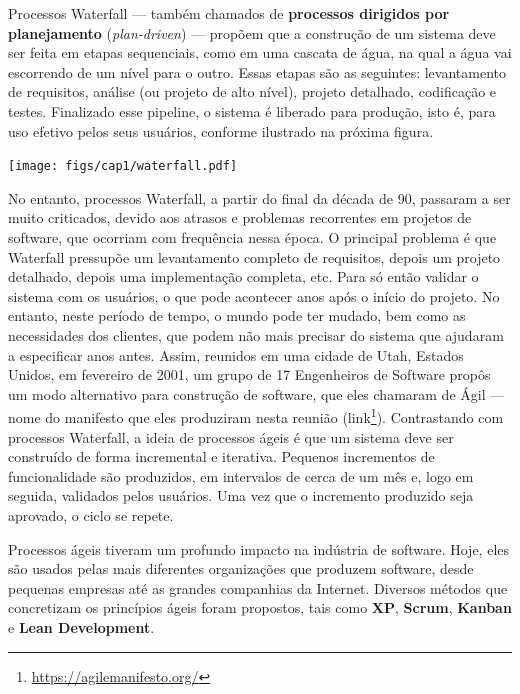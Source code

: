 \documentclass[
  11pt,
  twoside]{book}
\DeclareRobustCommand{\href}[2]{#2\footnote{\url{#1}}}
\let\origfigure\figure
\let\endorigfigure\endfigure
\renewenvironment{figure}[1][2] {
    \expandafter\origfigure\expandafter[!h]
} {
    \endorigfigure
}
\begin{document}
Processos Waterfall --- também chamados de \textbf{processos dirigidos
por planejamento} (\emph{plan-driven}) --- propõem que a construção de
um sistema deve ser feita em etapas sequenciais, como em uma cascata de
água, na qual a água vai escorrendo de um nível para o outro. Essas
etapas são as seguintes: levantamento de requisitos, análise (ou projeto
de alto nível), projeto detalhado, codificação e testes. Finalizado esse
pipeline, o sistema é liberado para produção, isto é, para uso efetivo
pelos seus usuários, conforme ilustrado na próxima figura.

\begin{figure}
\centering
\texttt{[image: figs/cap1/waterfall.pdf]}
\caption{Fases de um processo Waterfall.}
\end{figure}

  No entanto, processos
Waterfall, a partir do final da década de 90, passaram a ser muito
criticados, devido aos atrasos e problemas recorrentes em projetos de
software, que ocorriam com frequência nessa época. O principal problema
é que Waterfall pressupõe um levantamento completo de requisitos, depois
um projeto detalhado, depois uma implementação completa, etc. Para só
então validar o sistema com os usuários, o que pode acontecer anos após
o início do projeto. No entanto, neste período de tempo, o mundo pode
ter mudado, bem como as necessidades dos clientes, que podem não mais
precisar do sistema que ajudaram a especificar anos antes. Assim,
reunidos em uma cidade de Utah, Estados Unidos, em fevereiro de 2001, um
grupo de 17 Engenheiros de Software propôs um modo alternativo para
construção de software, que eles chamaram de Ágil --- nome do manifesto
que eles produziram nesta reunião
(\href{https://agilemanifesto.org/}{link}). Contrastando com processos
Waterfall, a ideia de processos ágeis é que um sistema deve ser
construído de forma incremental e iterativa. Pequenos incrementos de
funcionalidade são produzidos, em intervalos de cerca de um mês e, logo
em seguida, validados pelos usuários. Uma vez que o incremento produzido
seja aprovado, o ciclo se repete.

Processos ágeis tiveram um profundo impacto na indústria de software.
Hoje, eles são usados pelas mais diferentes organizações que produzem
software, desde pequenas empresas até as grandes companhias da Internet.
Diversos métodos que concretizam os princípios ágeis foram propostos,
tais como \textbf{XP}, \textbf{Scrum}, \textbf{Kanban} e \textbf{Lean
Development}.
\end{document}
